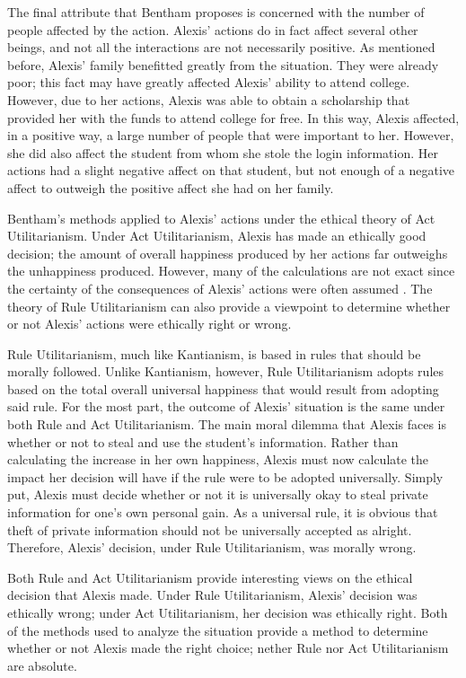 \documentclass{paper}
\begin{document}
\begin{linenumbers}
The final attribute that Bentham proposes is concerned with the number of people affected by the action. Alexis' actions do in fact affect several other beings, and not all the interactions are not necessarily positive. As mentioned before, Alexis' family benefitted greatly from the situation. They were already poor; this fact may have greatly affected Alexis' ability to attend college. However, due to her actions, Alexis was able to obtain a scholarship that provided her with the funds to attend college for free. In this way, Alexis affected, in a positive way, a large number of people that were important to her. However, she did also affect the student from whom she stole the login information. Her actions had a slight negative affect on that student, but not enough of a negative affect to outweigh the positive affect she had on her family.

Bentham's methods applied to Alexis' actions under the ethical theory of Act Utilitarianism. Under Act Utilitarianism, Alexis has made an ethically good decision; the amount of overall happiness produced by her actions far outweighs the unhappiness produced. However, many of the calculations are not exact since the certainty of the consequences of Alexis' actions were often assumed \cite[77]{ethics}. The theory of Rule Utilitarianism can also provide a viewpoint to determine whether or not Alexis' actions were ethically right or wrong.

Rule Utilitarianism, much like Kantianism, is based in rules that should be morally followed. Unlike Kantianism, however, Rule Utilitarianism adopts rules based on the total overall universal happiness that would result from adopting said rule. For the most part, the outcome of Alexis' situation is the same under both Rule and Act Utilitarianism. The main moral dilemma that Alexis faces is whether or not to steal and use the student's information. Rather than calculating the increase in her own happiness, Alexis must now calculate the impact her decision will have if the rule were to be adopted universally. Simply put, Alexis must decide whether or not it is universally okay to steal private information for one's own personal gain. As a universal rule, it is obvious that theft of private information should not be universally accepted as alright. Therefore, Alexis' decision, under Rule Utilitarianism, was morally wrong.

Both Rule and Act Utilitarianism provide interesting views on the ethical decision that Alexis made. Under Rule Utilitarianism, Alexis' decision was ethically wrong; under Act Utilitarianism, her decision was ethically right. Both of the methods used to analyze the situation provide a method to determine whether or not Alexis made the right choice; nether Rule nor Act Utilitarianism are absolute.
\end{linenumbers}
\newpage
\printbibliography
\end{document}
